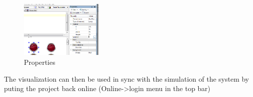 \documentclass[10pt,a4paper]{article}
\begin{document}
\begin{figure}[h!]
	\begin{center}
		\includegraphics[width=150px]{img12.png}
	\end{center}
\caption{Properties}
\label{fig:prop}
\end{figure}

The visualization can then be used in sync with the simulation of the system by puting the project back online (Online->login menu in the top bar)
\end{document}
